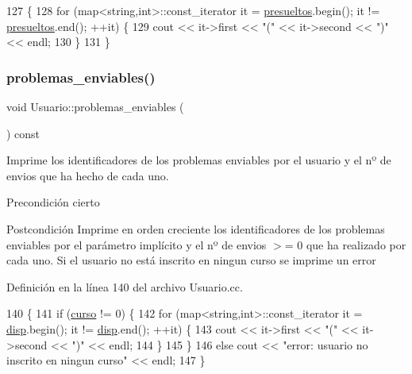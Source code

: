 \begin{DoxyCode}
127                                               \{
128         \textcolor{keywordflow}{for} (map<string,int>::const\_iterator it = \mbox{\hyperlink{class_usuario_ae614e565ce48a314a1e2b05beee8567b}{presueltos}}.begin(); it != 
      \mbox{\hyperlink{class_usuario_ae614e565ce48a314a1e2b05beee8567b}{presueltos}}.end(); ++it) \{
129           cout << it->first << \textcolor{stringliteral}{"("} << it->second << \textcolor{stringliteral}{")"} << endl;
130         \}
131       \}
\end{DoxyCode}
\mbox{\label{class_usuario_a79c8b5d178c8cfe7604210dc38d41fa1}} 
\subsubsection{\texorpdfstring{problemas\+\_\+enviables()}{problemas\_enviables()}}
{\footnotesize\ttfamily void Usuario\+::problemas\+\_\+enviables (\begin{DoxyParamCaption}{ }\end{DoxyParamCaption}) const}



Imprime los identificadores de los problemas enviables por el usuario y el nº de envios que ha hecho de cada uno. 

\begin{DoxyPrecond}{Precondición}
cierto 
\end{DoxyPrecond}
\begin{DoxyPostcond}{Postcondición}
Imprime en orden creciente los identificadores de los problemas enviables por el parámetro implícito y el nº de envios $>$= 0 que ha realizado por cada uno. Si el usuario no está inscrito en ningun curso se imprime un error 
\end{DoxyPostcond}


Definición en la línea 140 del archivo Usuario.\+cc.


\begin{DoxyCode}
140                                               \{
141         \textcolor{keywordflow}{if} (\mbox{\hyperlink{class_usuario_aa767fe2d1198f2c97791073bc55803e7}{curso}} != 0) \{
142           \textcolor{keywordflow}{for} (map<string,int>::const\_iterator it = \mbox{\hyperlink{class_usuario_a4402178ca5b057733c675e3849718e96}{disp}}.begin(); it != \mbox{\hyperlink{class_usuario_a4402178ca5b057733c675e3849718e96}{disp}}.end(); ++it) \{
143             cout << it->first << \textcolor{stringliteral}{"("} << it->second << \textcolor{stringliteral}{")"} << endl;
144           \}
145         \}
146         \textcolor{keywordflow}{else} cout << \textcolor{stringliteral}{"error: usuario no inscrito en ningun curso"} << endl;
147       \}
\end{DoxyCode}
\mbox{\label{class_usuario_a01715cdd7442952ccb578cd7dfa85a09}} 
